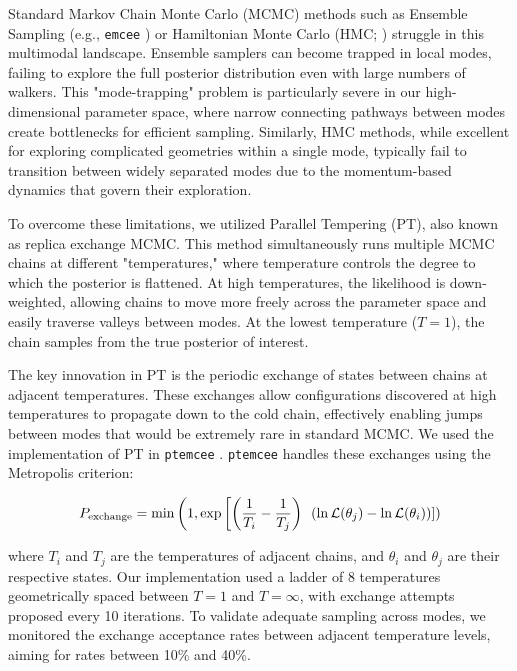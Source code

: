 \documentclass[twocolumn]{aastex631}
\begin{document}
Standard Markov Chain Monte Carlo (MCMC) methods such as Ensemble Sampling (e.g., \texttt{emcee} \cite{emcee}) or Hamiltonian Monte Carlo (HMC; \cite{Hoffman2011}) struggle 
in this multimodal landscape. Ensemble samplers can become trapped in local modes, failing to explore the full posterior 
distribution even with large numbers of walkers. This "mode-trapping" problem is particularly severe in our high-dimensional 
parameter space, where narrow connecting pathways between modes create bottlenecks for efficient sampling. Similarly, 
HMC methods, while excellent for exploring complicated geometries within a single mode, typically fail to transition between 
widely separated modes due to the momentum-based dynamics that govern their exploration.

To overcome these limitations, we utilized Parallel Tempering (PT), also known as replica exchange MCMC. 
This method simultaneously runs multiple MCMC chains at different "temperatures," where temperature controls the 
degree to which the posterior is flattened. At high temperatures, the likelihood is down-weighted, allowing chains to 
move more freely across the parameter space and easily traverse valleys between modes. At the lowest temperature 
($T=1$), the chain samples from the true posterior of interest.

The key innovation in PT is the periodic exchange of states between chains at adjacent temperatures. 
These exchanges allow configurations discovered at high temperatures to propagate down to the cold chain, 
effectively enabling jumps between modes that would be extremely rare in standard MCMC. We used the implementation
of PT in \texttt{ptemcee} \citep{ptemcee}. \texttt{ptemcee} handles these exchanges using the Metropolis criterion:

\begin{equation}
    \label{eq:ptemcee}
    P_{\rm exchange} = \min\left(1, \exp\left[\left(\frac{1}{T_i} - \frac{1}{T_j}\right)\right.\right.\left.\left.\left(\ln \mathcal{L}(\theta_j) - \ln \mathcal{L}(\theta_i)\right)\right]\right)
\end{equation}

where $T_i$ and $T_j$ are the temperatures of adjacent chains, and $\theta_i$ and $\theta_j$ are their respective states.
Our implementation used a ladder of 8 temperatures geometrically spaced between $T=1$ and $T=\infty$, with exchange attempts proposed 
every 10 iterations. To validate adequate sampling across modes, we monitored the exchange acceptance rates between adjacent 
temperature levels, aiming for rates between 10\% and 40\%.
\end{document}
